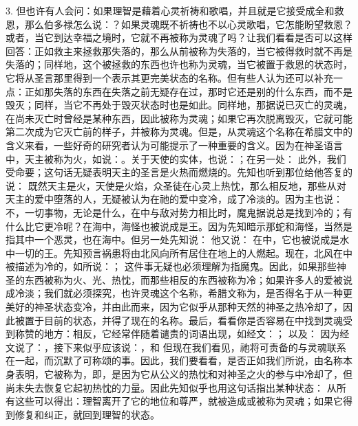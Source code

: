 3. 但也许有人会问：如果理智是藉着心灵祈祷和歌唱，并且就是它接受成全和救恩，那么伯多禄怎么说：？如果灵魂既不祈祷也不以心灵歌唱，它怎能盼望救恩？或者，当它到达幸福之境时，它就不再被称为灵魂了吗？让我们看看是否可以这样回答：正如救主来拯救那失落的，那么从前被称为失落的，当它被得救时就不再是失落的；同样地，这个被拯救的东西也许也称为灵魂，当它被置于救恩的状态时，它将从圣言那里得到一个表示其更完美状态的名称。但有些人认为还可以补充一点：正如那失落的东西在失落之前无疑存在过，那时它还是别的什么东西，而不是毁灭；同样，当它不再处于毁灭状态时也是如此。同样地，那据说已灭亡的灵魂，在尚未灭亡时曾经是某种东西，因此被称为灵魂；如果它再次脱离毁灭，它就可能第二次成为它灭亡前的样子，并被称为灵魂。但是，从灵魂这个名称在希腊文中的含义来看，一些好奇的研究者认为可能提示了一种重要的含义。因为在神圣语言中，天主被称为火，如说：。关于天使的实体，也说：；在另一处： 此外，我们受命要；这句话无疑表明天主的圣言是火热而燃烧的。先知也听到那位给他答复的说： 既然天主是火，天使是火焰，众圣徒在心灵上热忱，那么相反地，那些从对天主的爱中堕落的人，无疑被认为在祂的爱中变冷，成了冷淡的。因为主也说： 不，一切事物，无论是什么，在中与敌对势力相比时，魔鬼据说总是找到冷的；有什么比它更冷呢？在海中，海怪也被说成是王。因为先知暗示那蛇和海怪，当然是指其中一个恶灵，也在海中。但另一处先知说： 他又说： 在中，它也被说成是水中一切的王。先知预言祸患将由北风向所有居住在地上的人燃起。现在，北风在中被描述为冷的，如所说：； 这件事无疑也必须理解为指魔鬼。因此，如果那些神圣的东西被称为火、光、热忱，而那些相反的东西被称为冷；如果许多人的爱被说成冷淡；我们就必须探究，也许灵魂这个名称，希腊文称为，是否得名于从一种更美好的神圣状态变冷，并由此而来，因为它似乎从那种天然的神圣之热冷却了，因此被置于目前的状态，并得了现在的名称。最后，看看你是否容易在中找到灵魂受到称赞的地方：相反，它经常伴随着谴责的词语出现，如经文：； 以及： 因为经文说了：，接下来似乎应该说：，和 但现在我们看见，祂将可责备的与灵魂联系在一起，而沉默了可称颂的事。因此，我们要看看，是否正如我们所说，由名称本身表明，它被称为，即，是因为它从公义的热忱和对神圣之火的参与中冷却了，但尚未失去恢复它起初热忱的力量。因此先知似乎也用这句话指出某种状态： 从所有这些可以得出：理智离开了它的地位和尊严，就被造成或被称为灵魂；如果它得到修复和纠正，就回到理智的状态。\par

